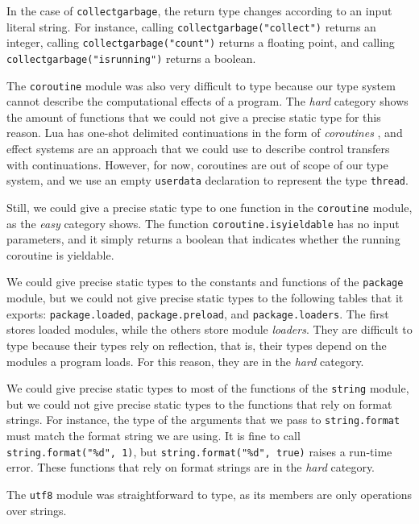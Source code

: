 In the case of \texttt{collectgarbage}, the return type changes
according to an input literal string.
For instance, calling \texttt{collectgarbage("collect")} returns an integer,
calling \texttt{collectgarbage("count")} returns a floating point,
and calling \texttt{collectgarbage("isrunning")} returns a boolean.

The \texttt{coroutine} module was also very difficult to type
because our type system cannot describe the computational effects
of a program.
The \emph{hard} category shows the amount of functions that we
could not give a precise static type for this reason.
Lua has one-shot delimited continuations \cite{james2011yield}
in the form of \emph{coroutines} \cite{moura2009rc}, and
effect systems \cite{nielson1999type} are an approach that we
could use to describe control transfers with continuations.
However, for now, coroutines are out of scope of our type
system, and we use an empty \texttt{userdata} declaration
to represent the type \texttt{thread}.

Still, we could give a precise static type to one function in
the \texttt{coroutine} module, as the \emph{easy} category shows.
The function \texttt{coroutine.isyieldable} has no input parameters,
and it simply returns a boolean that indicates whether the running
coroutine is yieldable.

We could give precise static types to the constants and functions
of the \texttt{package} module, but we could not give precise static
types to the following tables that it exports:
\texttt{package.loaded}, \texttt{package.preload}, and \texttt{package.loaders}.
The first stores loaded modules, while the others store module \emph{loaders}.
They are difficult to type because their types rely on reflection,
that is, their types depend on the modules a program loads.
For this reason, they are in the \emph{hard} category.

We could give precise static types to most of the functions of the
\texttt{string} module, but we could not give precise static types
to the functions that rely on format strings.
For instance, the type of the arguments that we pass to
\texttt{string.format} must match the format string we are using.
It is fine to call \texttt{string.format("\%d", 1)}, but
\texttt{string.format("\%d", true)} raises a run-time error.
These functions that rely on format strings are in the \emph{hard} category.

The \texttt{utf8} module was straightforward to type,
as its members are only operations over strings.

